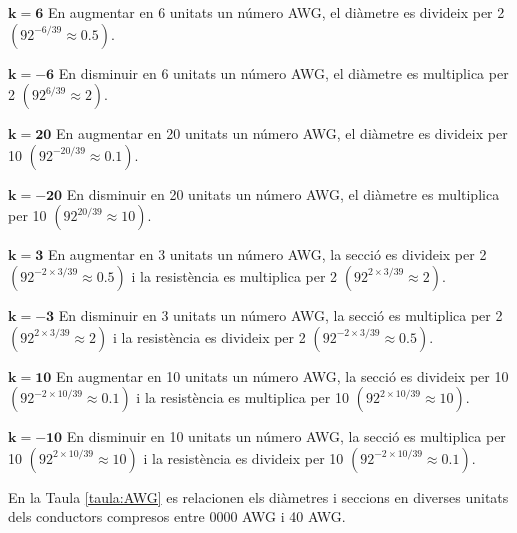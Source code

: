 \begin{list}{}
   {\setlength{\labelwidth}{15mm} \setlength{\leftmargin}{17mm} \setlength{\labelsep}{2mm}}

   \item[$\boldsymbol{k=6}$\hfill] En augmentar en 6  unitats un número AWG, el diàmetre es divideix per 2
                 $(92^{-6/39}\approx \num{0,5})$.

   \item[$\boldsymbol{k=-6}$\hfill] En disminuir en 6 unitats un número AWG, el diàmetre es multiplica per 2
                 $(92^{6/39}\approx 2)$.

   \item[$\boldsymbol{k=20}$\hfill] En augmentar en 20  unitats un número AWG, el diàmetre es divideix per 10
                 $(92^{-20/39}\approx \num{0,1})$.

   \item[$\boldsymbol{k=-20}$\hfill] En disminuir en 20 unitats un número AWG, el diàmetre es multiplica per 10
                 $(92^{20/39}\approx 10)$.

   \item[$\boldsymbol{k=3}$\hfill] En augmentar en 3 unitats un número AWG, la secció es divideix per 2
                 $(92^{-2\times 3/39}\approx \num{0,5})$ i la resistència es multiplica per 2
                 $(92^{2\times 3/39}\approx 2)$.

   \item[$\boldsymbol{k=-3}$\hfill] En disminuir en 3 unitats un número AWG, la secció es multiplica per 2
                  $(92^{2\times 3/39}\approx 2)$ i la resistència es divideix per 2
                  $(92^{-2\times 3/39}\approx \num{0,5})$.

   \item[$\boldsymbol{k=10}$\hfill] En augmentar en 10 unitats un número AWG, la secció es divideix per 10
                 $(92^{-2\times 10/39}\approx \num{0,1})$ i la resistència es multiplica per 10
                 $(92^{2\times 10/39}\approx 10)$.

   \item[$\boldsymbol{k=-10}$\hfill] En disminuir en 10 unitats un número AWG, la secció es multiplica per 10
                  $(92^{2\times 10/39}\approx 10)$ i la resistència es divideix per 10
                  $(92^{-2\times 10/39}\approx \num{0,1})$.
\end{list}

En la Taula \vref{taula:AWG} es relacionen els diàmetres i seccions en diverses unitats dels conductors compresos entre 0000 AWG i 40 AWG.

